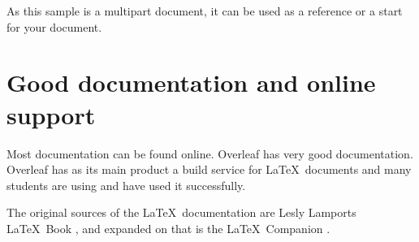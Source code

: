 As this sample is a multipart document, it can be used as a reference
or a start for your document.


\section{Good documentation and online support}
Most documentation can be found online. Overleaf has very good documentation. Overleaf has as its main product a build service for \LaTeX\ documents and many students are using and have used it successfully.

The original sources of the \LaTeX\ documentation are Lesly Lamports \LaTeX\ Book \textcite{latexbook}, and expanded on that is the \LaTeX\ Companion \parencite{latexcompanion}.

